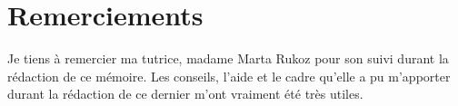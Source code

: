 \documentclass[memoire.tex]{subfiles}
\begin{document}
\chapter*{Remerciements}
Je tiens à remercier ma tutrice, madame Marta Rukoz pour son suivi durant la rédaction de ce mémoire. Les conseils, l'aide et le cadre qu'elle a pu m'apporter durant la rédaction de ce dernier m'ont vraiment été très utiles.
\end{document}

